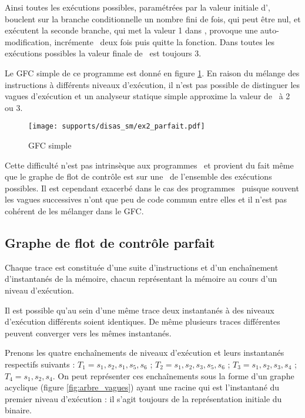 Ainsi toutes les exécutions possibles, paramétrées par la valeur initiale d'\eax, bouclent sur la branche conditionnelle un nombre fini de fois, qui peut être nul, et exécutent la seconde branche, qui met la valeur 1 dans \edi, provoque une auto-modification, incrémente \edi\ deux fois puis quitte la fonction. Dans toutes les exécutions possibles la valeur finale de \edi\ est toujours 3.

Le GFC simple de ce programme est donné en figure \ref{fig:sm_cfg_parfait}. En raison du mélange des instructions à différents niveaux d'exécution, il n'est pas possible de distinguer les vagues d'exécution et un analyseur statique simple approxime la valeur de \edi\ à 2 ou 3.

\begin{figure}[h]
\begin{center}
  \texttt{[image: supports/disas\_sm/ex2\_parfait.pdf]}
\end{center}
\caption{GFC simple}
\label{fig:sm_cfg_parfait}
\end{figure}



Cette difficulté n'est pas intrinsèque aux programmes \sms\ et provient du fait même que le graphe de flot de contrôle est sur une \sura\ de l'ensemble des exécutions possibles. Il est cependant exacerbé dans le cas des programmes \sms\ puisque souvent les vagues successives n'ont que peu de code commun entre elles et il n'est pas cohérent de les mélanger dans le GFC.

\FloatBarrier
\subsection{Graphe de flot de contrôle parfait\label{sec:gfc_parfait}}

Chaque trace est constituée d'une suite d'instructions et d'un enchaînement d'instantanés de la mémoire, chacun représentant la mémoire au cours d'un niveau d'exécution.

Il est possible qu'au sein d'une même trace deux instantanés à des niveaux d'exécution différents soient identiques.
De même plusieurs traces différentes peuvent converger vers les mêmes instantanés.

Prenons les quatre enchaînements de niveaux d'exécution et leurs instantanés respectifs suivants :
$T_1 = s_1, s_2, s_1, s_5, s_6$ ; 
$T_2 = s_1, s_2, s_3, s_5, s_6$ ; 
$T_3 = s_1, s_2, s_3, s_4$ ; 
$T_4 = s_1, s_2, s_4$.
On peut représenter ces enchaînements sous la forme d'un graphe acyclique (figure \ref{fig:arbre_vagues}) ayant une racine qui est l'instantané du premier niveau d'exécution : il s'agit toujours de la représentation initiale du binaire.

